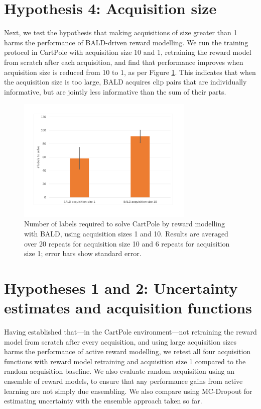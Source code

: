\documentclass[11pt, a4paper, bibliography=totoc]{report}
\begin{document}
\section{Hypothesis 4: Acquisition size}
Next, we test the hypothesis that making acquisitions of size greater than 1 harms the performance of BALD-driven reward modelling. We run the training protocol in CartPole with acquisition size 10 and 1, retraining the reward model from scratch after each acquisition, and find that performance improves when acquisition size is reduced from 10 to 1, as per Figure \ref{fig:acq_size}. This indicates that when the acquisition size is too large, BALD acquires clip pairs that are individually informative, but are jointly less informative than the sum of their parts.
\begin{figure}[h]
	\centering
	\includegraphics[width=0.75\textwidth]{acq_size}
	\caption{Number of labels required to solve CartPole by reward modelling with BALD, using acquisition sizes 1 and 10. Results are averaged over 20 repeats for acquisition size 10 and 6 repeats for acquisition size 1; error bars show standard error.}
	\label{fig:acq_size}
\end{figure}

\section{Hypotheses 1 and 2: Uncertainty estimates and acquisition functions}
Having established that---in the CartPole environment---not retraining the reward model from scratch after every acquisition, and using large acquisition sizes harms the performance of active reward modelling, we retest all four acquisition functions with reward model retraining and acquisition size 1 compared to the random acquisition baseline. We also evaluate random acquisition using an ensemble of reward models, to ensure that any performance gains from active learning are not simply due ensembling. We also compare using MC-Dropout for estimating uncertainty with the ensemble approach taken so far.
\end{document}
